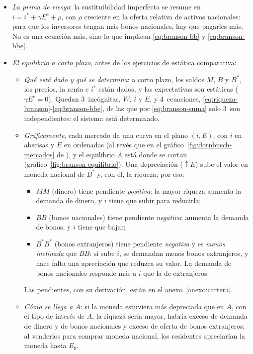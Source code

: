 \documentclass[11pt]{article}
\begin{document}
\begin{itemize}
\begin{itemize}
  \end{itemize}
\item \emph{La prima de riesgo}: la sustituibilidad imperfecta se resume en $i=i^*+\gamma E^e+\rho$, con $\rho$ creciente en la oferta relativa de activos nacionales: para que los inversores tengan más bonos nacionales, hay que pagarles más. No es una ecuación más, sino lo que implican \eqref{eq:branson-bb} y \eqref{eq:branson-bbe}.
\item \emph{El equilibrio a corto plazo}, antes de los ejercicios de estática comparativa:
  \begin{itemize}
  \item \emph{Qué está dado y qué se determina}: a corto plazo, los saldos $M$, $B$ y $B^*$, los precios, la renta e $i^*$ están dados, y las expectativas son estáticas ($\gamma E^e=0$). Quedan 3~incógnitas, $W$, $i$ y $E$, y 4~ecuaciones, \eqref{eq:riqueza-branson}-\eqref{eq:branson-bbe}, de las que por \eqref{eq:branson-suma} solo 3~son independientes: el sistema está determinado.
  \item \emph{Gráficamente}, cada mercado da una curva en el plano $(i,E)$, con $i$ en abscisas y $E$ en ordenadas (al revés que en el gráfico~\ref{fig:dornbusch-mercados} de ), y el equilibrio $A$ está donde se cortan (gráfico~\ref{fig:branson-equilibrio}). Una depreciación ($\uparrow E$) sube el valor en moneda nacional de $B^*$ y, con él, la riqueza; por eso:
    \begin{itemize}
    \item $MM$ (dinero) tiene pendiente \emph{positiva}: la mayor riqueza aumenta la demanda de dinero, y $i$ tiene que subir para reducirla;
    \item $BB$ (bonos nacionales) tiene pendiente \emph{negativa}: aumenta la demanda de bonos, y $i$ tiene que bajar;
    \item $B^*B^*$ (bonos extranjeros) tiene pendiente \emph{negativa} y es \emph{menos inclinada} que $BB$: si sube $i$, se demandan menos bonos extranjeros, y hace falta una apreciación que reduzca su valor. La demanda de bonos nacionales responde más a $i$ que la de extranjeros.
    \end{itemize}
    Las pendientes, con su derivación, están en el anexo~\ref{anexo:cartera}.
  \item \emph{Cómo se llega a $A$}: si la moneda estuviera más depreciada que en $A$, con el tipo de interés de $A$, la riqueza sería mayor, habría exceso de demanda de dinero y de bonos nacionales y exceso de oferta de bonos extranjeros; al venderlos para comprar moneda nacional, los residentes apreciarían la moneda hasta $E_0$.
  \end{itemize}
\end{itemize}
\end{document}
